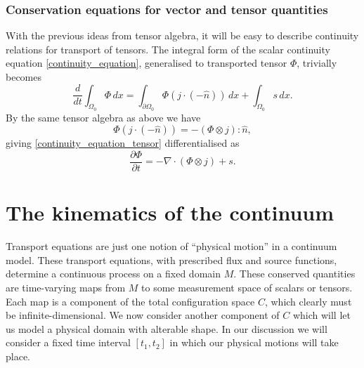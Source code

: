 \documentclass[11pt,a4paper]{memoir}
\newcommand{\Part}[2]{\frac{\partial #1}{\partial #2}}
\begin{document}
\subsubsection{Conservation equations for vector and tensor quantities}
With the previous ideas from tensor algebra, it will be easy to describe continuity relations for transport of tensors. The integral form of the scalar continuity equation \eqref{continuity_equation}, generalised to transported tensor $\Phi$, trivially becomes
\begin{equation}\label{continuity_equation_tensor}
    \frac{d}{dt} \int_{\Omega_0} \Phi\,dx = \int_{\partial\Omega_0} \Phi \left(j\cdot (-\hat{n})\right)\,dx + \int_{\Omega_0} s\,dx.
\end{equation}
By the same tensor algebra as above we have
    $$
        \Phi \left(j\cdot (-\hat{n})\right) = -\left(\Phi \otimes j\right) : \hat{n},
    $$
giving \eqref{continuity_equation_tensor} differentialised as
\begin{equation}\label{continuity_equation_tensor_differential}
    \Part{\Phi}{t} = -\nabla\cdot (\Phi \otimes j) + s.
\end{equation}
\section{The kinematics of the continuum}
Transport equations are just one notion of ``physical motion'' in a continuum model.
These transport equations, with prescribed flux and source functions, determine a continuous process on a fixed
domain $M$. These conserved quantities are time-varying maps from $M$ to some measurement space of scalars or tensors.
Each map is a component of the total configuration space $C$, which clearly must be infinite-dimensional.
We now consider another component of $C$
which will let us model a physical domain with alterable shape.
In our discussion we will consider a fixed time interval $[t_1, t_2]$ in which our physical motions will take place.
\end{document}
